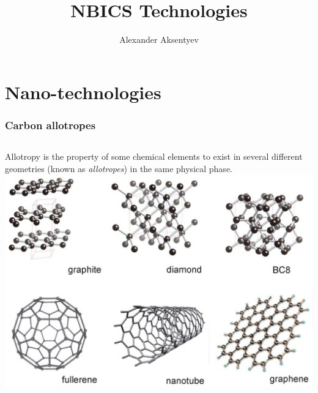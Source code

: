 \documentclass{beamer}
\title{NBICS Technologies}
\author{Alexander Aksentyev}
\institute{National Research Nuclear University ``MEPhI''}
\date{}
\begin{document}
	\begin{frame}
		\titlepage
	\end{frame}

\section{Nano-technologies}

\begin{frame}
	\frametitle{Carbon allotropes}
	\begin{columns}
		\column{.4\textwidth}
		Allotropy is the property of some chemical elements to exist in several different geometries (known as \emph{allotropes}) in the same physical phase.
		\column{.6\textwidth}
		\includegraphics[scale=.45]{CarbAllotropes}
	\end{columns}
\end{frame}
\end{document}
